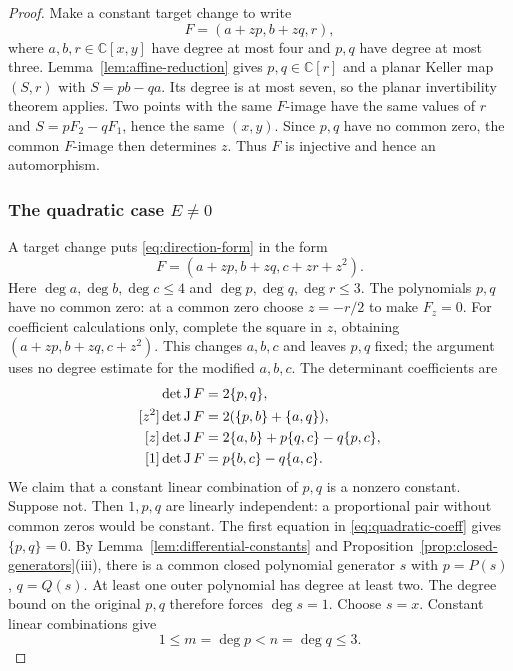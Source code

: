 \documentclass[11pt,reqno]{amsart}
\numberwithin{equation}{section}
\theoremstyle{plain}
\theoremstyle{definition}
\theoremstyle{remark}
\newcommand{\C}{\mathbb C}
\newcommand{\J}{\operatorname J}
\begin{document}
\begin{proof}
Make a constant target change to write
\begin{equation}\label{eq:affine-dependent}
F=(a+zp,b+zq,r),
\end{equation}
where $a,b,r\in\C[x,y]$ have degree at most four and $p,q$ have degree at most three.
Lemma~\ref{lem:affine-reduction} gives $p,q\in\C[r]$ and a planar Keller map $(S,r)$ with $S=pb-qa$.
Its degree is at most seven, so the planar invertibility theorem applies.
Two points with the same $F$-image have the same values of $r$ and $S=pF_2-qF_1$, hence the same $(x,y)$. Since $p,q$ have no common zero, the common $F$-image then determines $z$.
Thus $F$ is injective and hence an automorphism.

\subsubsection*{The quadratic case \texorpdfstring{$E\ne0$}{E not equal to 0}}
A target change puts \eqref{eq:direction-form} in the form
\begin{equation}\label{eq:quadratic-original}
F=(a+zp,b+zq,c+zr+z^2).
\end{equation}
Here $\deg a,\deg b,\deg c\le4$ and $\deg p,\deg q,\deg r\le3$. The polynomials $p,q$ have no common zero: at a common zero choose $z=-r/2$ to make $F_z=0$.
For coefficient calculations only, complete the square in $z$, obtaining $(a+zp,b+zq,c+z^2)$. This changes $a,b,c$ and leaves $p,q$ fixed; the argument uses no degree
estimate for the modified $a,b,c$. The determinant coefficients are
\begin{align}
[z^3]\det\J F&=2\{p,q\},\notag\\
[z^2]\det\J F&=2(\{p,b\}+\{a,q\}),\notag\\
[z]\det\J F&=2\{a,b\}+p\{q,c\}-q\{p,c\},\label{eq:quadratic-coeff}\\
[1]\det\J F&=p\{b,c\}-q\{a,c\}.\notag
\end{align}
We claim that a constant linear combination of $p,q$ is a nonzero constant.
Suppose not. Then $1,p,q$ are linearly independent: a proportional pair
without common zeros would be constant. The first equation in
\eqref{eq:quadratic-coeff} gives $\{p,q\}=0$. By
Lemma~\ref{lem:differential-constants} and
Proposition~\ref{prop:closed-generators}(iii), there is a common closed
polynomial generator $s$
with $p=P(s)$, $q=Q(s)$. At least one outer polynomial has degree at least
two. The degree bound on the original $p,q$ therefore forces $\deg s=1$.
Choose $s=x$. Constant linear combinations give
\[
1\le m=\deg p<n=\deg q\le3.
\]
\end{proof}
\end{document}
